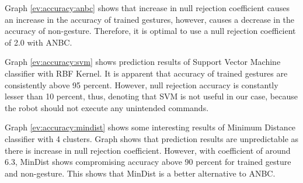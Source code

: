 Graph \ref{ev:accuracy:anbc} shows that increase in null rejection coefficient causes an increase in the accuracy of trained gestures, however, causes a decrease in the accuracy of non-gesture. Therefore, it is optimal to use a null rejection coefficient of 2.0 with ANBC.

Graph \ref{ev:accuracy:svm} shows prediction results of Support Vector Machine classifier with RBF Kernel. It is apparent that accuracy of trained gestures are consistently above 95 percent. However, null rejection accuracy is constantly lesser than 10 percent, thus, denoting that SVM is not useful in our case, because the robot should not execute any unintended commands.

Graph \ref{ev:accuracy:mindist} shows some interesting results of Minimum Distance classifier with 4 clusters. Graph shows that prediction results are unpredictable as there is increase in null rejection coefficient. However, with coefficient of around 6.3, MinDist shows compromising accuracy above 90 percent for trained gesture and non-gesture. This shows that MinDist is a better alternative to ANBC. 



\clearpage 
 
 

